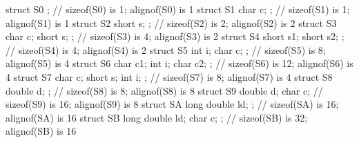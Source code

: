 \begin{emcppslisting}
struct S0 { };                           // sizeof(S0) is  1; alignof(S0) is  1   
struct S1 { char c; };                   // sizeof(S1) is  1; alignof(S1) is  1   
struct S2 { short s; };                  // sizeof(S2) is  2; alignof(S2) is  2   
struct S3 { char c; short s; };          // sizeof(S3) is  4; alignof(S3) is  2   
struct S4 { short s1; short s2; };       // sizeof(S4) is  4; alignof(S4) is  2   
struct S5 { int i; char c; };            // sizeof(S5) is  8; alignof(S5) is  4   
struct S6 { char c1; int i; char c2; };  // sizeof(S6) is 12; alignof(S6) is  4   
struct S7 { char c; short s; int i; };   // sizeof(S7) is  8; alignof(S7) is  4   
struct S8 { double d; };                 // sizeof(S8) is  8; alignof(S8) is  8   
struct S9 { double d; char c; }          // sizeof(S9) is 16; alignof(S9) is  8   
struct SA { long double ld; };           // sizeof(SA) is 16; alignof(SA) is 16   
struct SB { long double ld; char c; };   // sizeof(SB) is 32; alignof(SB) is 16
\end{emcppslisting}


